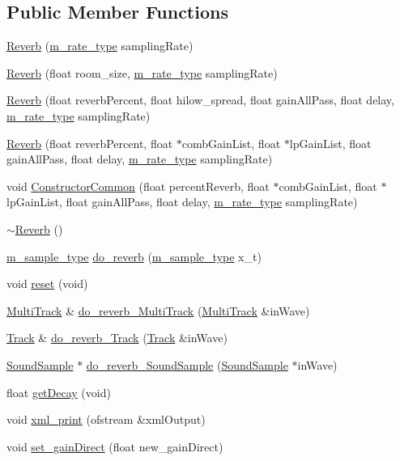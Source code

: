 \subsection*{Public Member Functions}
\begin{CompactItemize}
\item 
\hyperlink{classReverb_a0}{Reverb} (\hyperlink{Types_8h_a4}{m\_\-rate\_\-type} sampling\-Rate)
\item 
\hyperlink{classReverb_a1}{Reverb} (float room\_\-size, \hyperlink{Types_8h_a4}{m\_\-rate\_\-type} sampling\-Rate)
\item 
\hyperlink{classReverb_a2}{Reverb} (float reverb\-Percent, float hilow\_\-spread, float gain\-All\-Pass, float delay, \hyperlink{Types_8h_a4}{m\_\-rate\_\-type} sampling\-Rate)
\item 
\hyperlink{classReverb_a3}{Reverb} (float reverb\-Percent, float $\ast$comb\-Gain\-List, float $\ast$lp\-Gain\-List, float gain\-All\-Pass, float delay, \hyperlink{Types_8h_a4}{m\_\-rate\_\-type} sampling\-Rate)
\item 
void \hyperlink{classReverb_a4}{Constructor\-Common} (float percent\-Reverb, float $\ast$comb\-Gain\-List, float $\ast$lp\-Gain\-List, float gain\-All\-Pass, float delay, \hyperlink{Types_8h_a4}{m\_\-rate\_\-type} sampling\-Rate)
\item 
\hyperlink{classReverb_a5}{$\sim$Reverb} ()
\item 
\hyperlink{Types_8h_a0}{m\_\-sample\_\-type} \hyperlink{classReverb_a6}{do\_\-reverb} (\hyperlink{Types_8h_a0}{m\_\-sample\_\-type} x\_\-t)
\item 
void \hyperlink{classReverb_a7}{reset} (void)
\item 
\hyperlink{classMultiTrack}{Multi\-Track} \& \hyperlink{classReverb_a8}{do\_\-reverb\_\-Multi\-Track} (\hyperlink{classMultiTrack}{Multi\-Track} \&in\-Wave)
\item 
\hyperlink{classTrack}{Track} \& \hyperlink{classReverb_a9}{do\_\-reverb\_\-Track} (\hyperlink{classTrack}{Track} \&in\-Wave)
\item 
\hyperlink{classSoundSample}{Sound\-Sample} $\ast$ \hyperlink{classReverb_a10}{do\_\-reverb\_\-Sound\-Sample} (\hyperlink{classSoundSample}{Sound\-Sample} $\ast$in\-Wave)
\item 
float \hyperlink{classReverb_a11}{get\-Decay} (void)
\item 
void \hyperlink{classReverb_a12}{xml\_\-print} (ofstream \&xml\-Output)
\item 
void \hyperlink{classReverb_a13}{set\_\-gain\-Direct} (float new\_\-gain\-Direct)

\end{CompactItemize}
